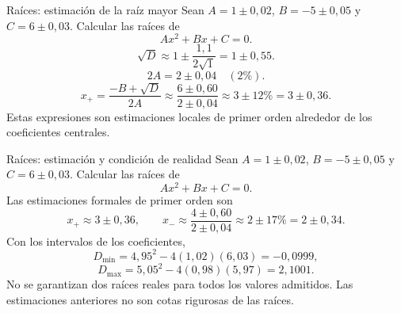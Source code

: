 \documentclass[main.tex]{subfiles}
\begin{document}
\begin{frame}{Raíces: estimación de la raíz mayor}
\small Sean $A=1\pm0{,}02$, $B=-5\pm0{,}05$ y $C=6\pm0{,}03$. Calcular las raíces de\[Ax^2+Bx+C=0.\]\[\sqrt D\approx1\pm\frac{1{,}1}{2\sqrt1}=1\pm0{,}55.\]\[2A=2\pm0{,}04\quad(2\%).\]\[x_+=\frac{-B+\sqrt D}{2A}\approx\frac{6\pm0{,}60}{2\pm0{,}04}\approx3\pm12\%=3\pm0{,}36.\]Estas expresiones son estimaciones locales de primer orden alrededor de los coeficientes centrales.
\end{frame}

\begin{frame}{Raíces: estimación y condición de realidad}
\small Sean $A=1\pm0{,}02$, $B=-5\pm0{,}05$ y $C=6\pm0{,}03$. Calcular las raíces de\[Ax^2+Bx+C=0.\]Las estimaciones formales de primer orden son\[x_+\approx3\pm0{,}36,\qquad x_-\approx\frac{4\pm0{,}60}{2\pm0{,}04}\approx2\pm17\%=2\pm0{,}34.\]Con los intervalos de los coeficientes,\[D_{\min}=4{,}95^2-4(1{,}02)(6{,}03)=-0{,}0999,\]\[D_{\max}=5{,}05^2-4(0{,}98)(5{,}97)=2{,}1001.\]No se garantizan dos raíces reales para todos los valores admitidos. Las estimaciones anteriores no son cotas rigurosas de las raíces.
\end{frame}
\end{document}
